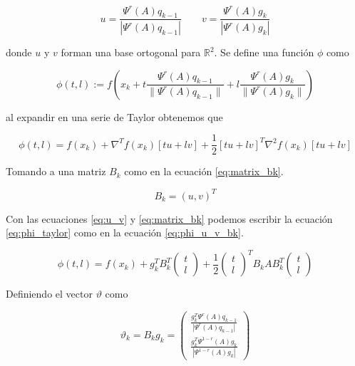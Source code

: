 \begin{equation}
    u = \frac{\Psi^r(A)q_{k-1}}{|\Psi^r(A)q_{k-1}|} \qquad
    v = \frac{\Psi^r(A)g_{k}}{|\Psi^r(A)g_{k}|} \label{eq:u_v}
\end{equation}

donde $u$ y $v$ forman una base ortogonal para $\mathbb{R}^2$. Se define una función $\phi$ como

\begin{equation}
    \phi(t,l):=f\left(x_k+t\frac{\Psi^r(A)q_{k-1}}{\|\Psi^r(A)q_{k-1}\|} + l \frac{\Psi^r(A)g_{k}}{\|\Psi^r(A)g_{k}\|}\right) \label{eq:phi_definition}
\end{equation}

al expandir en una serie de Taylor obtenemos que

\begin{equation}
    \phi(t,l) = f(x_k)+\nabla^T f(x_k) \left[tu+lv \right] + \frac{1}{2}\left[tu+ lv \right]^T\nabla^2 f(x_k) \left[tu+lv \right] \label{eq:phi_taylor}
\end{equation}

Tomando a una matriz $B_k$ como en la ecuación \ref{eq:matrix_bk}.

\begin{equation}
    B_k =  \left(u, v\right)^T \label{eq:matrix_bk}
\end{equation}

Con las ecuaciones \ref{eq:u_v} y \ref{eq:matrix_bk} podemos escribir la ecuación \ref{eq:phi_taylor} como en la ecuación \ref{eq:phi_u_v_bk}.

\begin{equation}
    \phi(t, l) =  f(x_k)+g_k^TB_k^T\begin{pmatrix}t\\l\end{pmatrix} +\frac{1}{2}\begin{pmatrix}t\\l\end{pmatrix}^TB_k A B_k^T\begin{pmatrix}t\\l\end{pmatrix} \label{eq:phi_u_v_bk}
\end{equation}

Definiendo el vector $\vartheta$ como

\begin{equation}
    \vartheta_k = B_kg_k =
    \begin{pmatrix}
        \frac{g_k^T\Psi^r(A)q_{k-1}}{|\Psi^{r}(A)q_{k-1}|} \\[0.25cm]
        \frac{g_k^T\Psi^{1-r}(A)g_k}{|\Psi^{1-r}(A)g_k|}
    \end{pmatrix}
    \label{eq:vartheta_k}
\end{equation}

